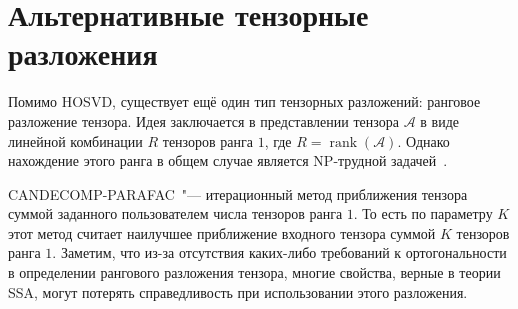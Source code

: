 \documentclass[specialist,
    substylefile = spbu_report.rtx,
    subf,href,colorlinks=true, 12pt]{disser}
\theoremstyle{plain}
\theoremstyle{definition}
\theoremstyle{remark}
\begin{document}
    \section{Альтернативные тензорные разложения}\label{sec:other-decomp}
    Помимо HOSVD, существует ещё один тип тензорных разложений: ранговое разложение тензора.
    Идея заключается в представлении тензора $\mathcal{A}$ в виде линейной комбинации $R$ тензоров ранга $1$, где $R=\operatorname{rank}(\mathcal{A})$.
    Однако нахождение этого ранга в общем случае является NP-трудной задачей~\cite{NP-hard}.

    CANDECOMP-PARAFAC~\cite{parafac1, parafac2}"--- итерационный метод приближения тензора суммой заданного
    пользователем числа тензоров ранга $1$.
    То есть по параметру $K$ этот метод считает наилучшее приближение входного тензора суммой $K$ тензоров ранга $1$.
    Заметим, что из-за отсутствия каких-либо требований к ортогональности в определении рангового разложения тензора,
    многие свойства, верные в теории SSA, могут потерять справедливость при использовании этого разложения.
\end{document}
